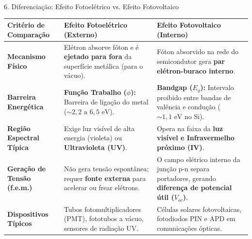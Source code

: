 \documentclass[aspectratio=169, 10pt]{beamer}
\begin{document}
\begin{frame}{6. Diferenciação: Efeito Fotoelétrico vs. Efeito Fotovoltaico}
  \vspace{-0.15cm}
  \footnotesize
  \begin{table}
    \centering
    \begin{tabular}{p{3.2cm}p{5.6cm}p{5.6cm}}
      \toprule
      \textbf{Critério de Comparação} & \textbf{Efeito Fotoelétrico (Externo)} & \textbf{Efeito Fotovoltaico (Interno)} \\
      \midrule
      \textbf{Mecanismo Físico} & Elétron absorve fóton e é \textbf{ejetado para fora} da superfície metálica (para o vácuo). & Fóton absorvido na rede do semicondutor gera \textbf{par elétron-buraco interno}. \\
      \addlinespace[0.1cm]
      \textbf{Barreira Energética} & \textbf{Função Trabalho ($\phi$):} Barreira de ligação do metal ($\sim 2{,}2\text{ a }6{,}5\text{ eV}$). & \textbf{Bandgap ($E_g$):} Intervalo proibido entre bandas de valência e condução ($\sim 1{,}1\text{ eV}$ no Si). \\
      \addlinespace[0.1cm]
      \textbf{Região Espectral Típica} & Exige luz visível de alta energia (violeta) ou \textbf{Ultravioleta (UV)}. & Opera na faixa da \textbf{luz visível e Infravermelho próximo (IV)}. \\
      \addlinespace[0.1cm]
      \textbf{Geração de Tensão (f.e.m.)} & Não gera tensão espontânea; requer \textbf{fonte externa} para acelerar ou frear elétrons. & O campo elétrico interno da junção p-n separa portadores, gerando \textbf{diferença de potencial útil ($V_{oc}$)}. \\
      \addlinespace[0.1cm]
      \textbf{Dispositivos Típicos} & Tubos fotomultiplicadores (PMT), fototubos a vácuo, sensores de radiação UV. & Células solares fotovoltaicas, fotodiodos PIN e APD em comunicações ópticas. \\
      \bottomrule
    \end{tabular}
  \end{table}
\end{frame}
\end{document}

